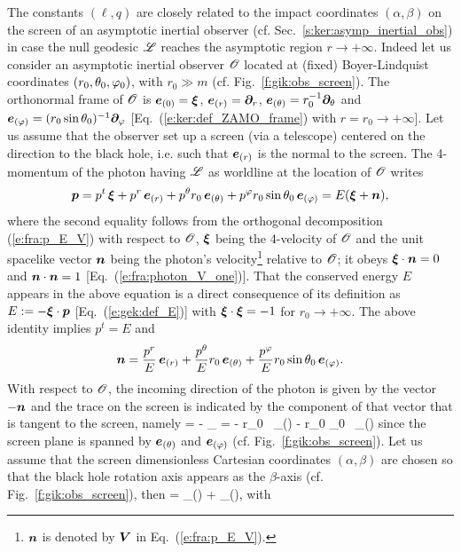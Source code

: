 The constants $(\ell,q)$ are closely related to the impact coordinates $(\alpha,\beta)$
on the screen of an asymptotic inertial observer (cf. Sec.~\ref{s:ker:asymp_inertial_obs})
in case the null geodesic $\mathscr{L}$ reaches the asymptotic region $r\to +\infty$.
Indeed let us consider an asymptotic inertial observer $\mathscr{O}$ located at (fixed) Boyer-Lindquist
coordinates $(r_0, \theta_0, \varphi_0)$, with $r_0 \gg m$ (cf. Fig.~\ref{f:gik:obs_screen}).
The orthonormal frame of $\mathscr{O}$ is $\bm{e}_{(0)} =\bm{\xi}$, $\bm{e}_{(r)} = \bm{\partial}_r$,
$\bm{e}_{(\theta)} = r_0^{-1} \bm{\partial}_\theta$ and $\bm{e}_{(\varphi)} = (r_0\sin\theta_0)^{-1} \bm{\partial}_\varphi$
[Eq.~(\ref{e:ker:def_ZAMO_frame}) with $r = r_0\to +\infty$].
Let us assume that the observer set up a screen (via a telescope) centered on the direction to the
black hole, i.e. such that $\bm{e}_{(r)}$ is the normal to the screen. The 4-momentum of the photon
having $\mathscr{L}$ as worldline at the location of $\mathscr{O}$ writes
\[
    \bm{p} = p^t \, \bm{\xi} + p^r \, \bm{e}_{(r)} + p^\theta r_0 \, \bm{e}_{(\theta)}
    + p^\varphi r_0 \sin\theta_0 \, \bm{e}_{(\varphi)} =  E (\bm{\xi} + \bm{n}) ,
\]
where the second equality follows from the orthogonal decomposition (\ref{e:fra:p_E_V}) with respect to
$\mathscr{O}$, $\bm{\xi}$ being the 4-velocity of $\mathscr{O}$ and the unit spacelike vector $\bm{n}$ being the photon's velocity\footnote{$\bm{n}$ is denoted by $\bm{V}$ in Eq.~(\ref{e:fra:p_E_V}).} relative to $\mathscr{O}$; it
obeys $\bm{\xi}\cdot\bm{n} = 0$ and $\bm{n}\cdot\bm{n} = 1$ [Eq.~(\ref{e:fra:photon_V_one})].
That the conserved energy $E$ appears in the above equation is a direct consequence of its
definition as $E := - \bm{\xi}\cdot \bm{p}$ [Eq.~(\ref{e:gek:def_E})] with $\bm{\xi}\cdot\bm{\xi} = -1$
for $r_0\to +\infty$. The above identity implies
$p^t = E$ and
\[
    \bm{n} = \frac{p^r}{E} \, \bm{e}_{(r)} + \frac{p^\theta}{E} r_0 \, \bm{e}_{(\theta)}
    + \frac{p^\varphi}{E} r_0 \sin\theta_0 \, \bm{e}_{(\varphi)} .
\]
With respect to $\mathscr{O}$, the incoming direction of the photon is given by
the vector $-\bm{n}$ and the trace on the screen is indicated by the component of that
vector that is tangent to the screen, namely
\be \label{e:gik:m_screen_p}
     = - _{\parallel} = -  r_0 \, _{(\th)}
    -   r_0 \sin\th_0 \, _{(\ph)}
\ee
since the screen plane is spanned by $\bm{e}_{(\theta)}$ and $\bm{e}_{(\varphi)}$
(cf. Fig.~\ref{f:gik:obs_screen}). Let us assume that the screen dimensionless
Cartesian coordinates $(\alpha,\beta)$ are chosen so that the black hole rotation axis
appears as the $\beta$-axis (cf. Fig.~\ref{f:gik:obs_screen}), then
\be \label{e:gik:m_screen_ab}
     = \alpha {}_{(\alpha)} + \beta {}_{(\beta)}, \quad\mbox{with}\quad

